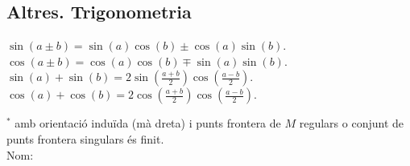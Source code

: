 \documentclass[10pt]{article}
\newcommand{\ci}{\textbullet\;}
\begin{document}
\begin{multicols}{4}
\subsection{Altres. Trigonometria}
\ci $\sin(a \pm b) = \sin(a)\cos(b) \pm \cos(a)\sin(b)$. \\
\ci $\cos(a \pm b) = \cos(a)\cos(b) \mp \sin(a)\sin(b)$. \\
\ci $\sin(a) + \sin(b) = 2\sin(\frac{a+b}{2})\cos(\frac{a-b}{2})$. \\
\ci $\cos(a) + \cos(b) = 2\cos(\frac{a+b}{2})\cos(\frac{a-b}{2})$.

\noindent\makebox[\linewidth]{\rule{\linewidth}{0.5pt}}
$^\ast$ amb orientació induïda (m\`a dreta) i punts frontera de $M$ regulars o conjunt de punts frontera singulars \'es finit. \\
\vspace{3pt}
\raggedleft
{\large Nom: \underline{\hspace{5cm}}}


\end{multicols}
\end{document}

